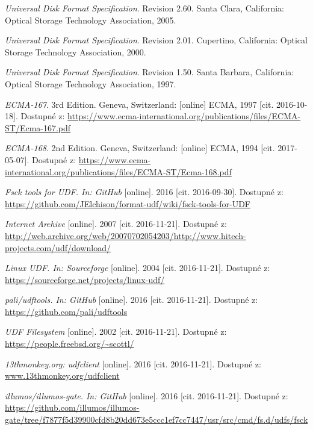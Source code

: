 \begin{literatura}{99}
	
    \emph{Universal Disk Format Specification}. Revision 2.60. Santa Clara, California: Optical Storage Technology Association, 2005.

    \emph{Universal Disk Format Specification}. Revision 2.01. Cupertino, California: Optical Storage Technology Association, 2000.

    \emph{Universal Disk Format Specification}. Revision 1.50. Santa Barbara, California: Optical Storage Technology Association, 1997.

    \emph{ECMA-167}. 3rd Edition. Geneva, Switzerland: [online] ECMA, 1997 [cit. 2016-10-18]. Dostupné z: \url{https://www.ecma-international.org/publications/files/ECMA-ST/Ecma-167.pdf}

    \emph{ECMA-168}. 2nd Edition. Geneva, Switzerland: [online] ECMA, 1994 [cit. 2017-05-07]. Dostupné z: \url{https://www.ecma-international.org/publications/files/ECMA-ST/Ecma-168.pdf}

    \emph{Fsck tools for UDF. In: GitHub}\/ [online]. 2016 [cit. 2016-09-30]. Dostupné z: \url{https://github.com/JElchison/format-udf/wiki/fsck-tools-for-UDF}

    \emph{Internet Archive}\/ [online]. 2007 [cit. 2016-11-21]. Dostupné z: \url{http://web.archive.org/web/20070702054203/http://www.hitech-projects.com/udf/download/}

    \emph{Linux UDF. In: Sourceforge}\/ [online]. 2004 [cit. 2016-11-21]. Dostupné z: \url{https://sourceforge.net/projects/linux-udf/}

    \emph{pali/udftools. In: GitHub}\/ [online]. 2016 [cit. 2016-11-21]. Dostupné z: \url{https://github.com/pali/udftools}

    \emph{UDF Filesystem}\/ [online]. 2002 [cit. 2016-11-21]. Dostupné z: \url{https://people.freebsd.org/~scottl/}

    \emph{13thmonkey.org: udfclient}\/ [online]. 2016 [cit. 2016-11-21]. Dostupné z: \url{www.13thmonkey.org/udfclient}  

    \emph{illumos/illumos-gate. In: GitHub}\/ [online]. 2016 [cit. 2016-11-21]. Dostupné z: \url{https://github.com/illumos/illumos-gate/tree/f7877f5d39900cfd8b20dd673e5ccc1ef7cc7447/usr/src/cmd/fs.d/udfs/fsck} 


\end{literatura}
